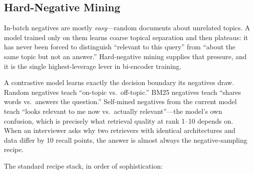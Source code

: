 \subsection{Hard-Negative Mining}
\label{sr:subsec:hard_negatives}

In-batch negatives are mostly \textit{easy}---random documents about unrelated topics. A model trained only on them learns coarse topical separation and then plateaus: it has never been forced to distinguish ``relevant to this query'' from ``about the same topic but not an answer.'' Hard-negative mining supplies that pressure, and it is the single highest-leverage lever in bi-encoder training.

\begin{keyinsight}
A contrastive model learns exactly the decision boundary its negatives draw. Random negatives teach ``on-topic vs.\ off-topic.'' BM25 negatives teach ``shares words vs.\ answers the question.'' Self-mined negatives from the current model teach ``looks relevant to me now vs.\ actually relevant''---the model's own confusion, which is precisely what retrieval quality at rank 1--10 depends on. When an interviewer asks why two retrievers with identical architectures and data differ by 10 recall points, the answer is almost always the negative-sampling recipe.
\end{keyinsight}

The standard recipe stack, in order of sophistication:

